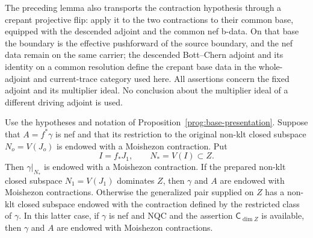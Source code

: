 \begin{remark}
The preceding lemma also transports the contraction hypothesis
through a crepant projective flip: apply it to the two contractions
to their common base, equipped with the descended adjoint and
the common nef b-data. On that base the boundary is the effective
pushforward of the source boundary, and the nef data remain on
the same carrier; the descended Bott--Chern adjoint and its
identity on a common resolution define the crepant base data
in the whole-adjoint and current-trace category used here.
All assertions concern the fixed adjoint
and its multiplier ideal. No conclusion about the multiplier
ideal of a different driving adjoint is used.
\end{remark}

\begin{corollary}
\label{prog:base-emc-induction}
Use the hypotheses and notation of
Proposition~\ref{prog:base-presentation}. Suppose that
$A=f^*\gamma$ is nef and that its restriction to the original
non-klt closed subspace $N_o=V(J_o)$ is endowed with a
Moishezon contraction. Put
\[
                I=f_*J_1,\qquad N_*=V(I)\subset Z.
\]
Then $\gamma|_{N_*}$ is endowed with a Moishezon contraction.
If the prepared non-klt closed subspace $N_1=V(J_1)$ dominates
$Z$, then $\gamma$ and $A$ are endowed with Moishezon
contractions. Otherwise the generalized pair supplied on $Z$
has a non-klt closed subspace endowed with the contraction
defined by the restricted class of $\gamma$. In this latter
case, if $\gamma$ is nef and NQC and the assertion
$\mathsf C_{\dim Z}$ is available, then $\gamma$ and $A$
are endowed with Moishezon contractions.
\end{corollary}

